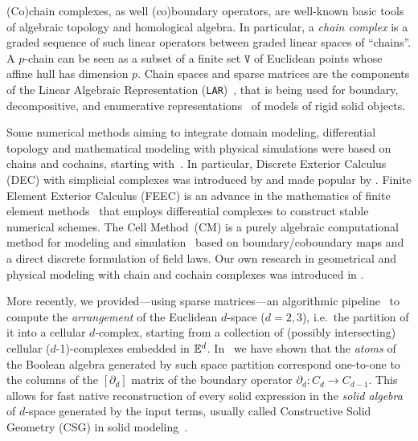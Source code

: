 (Co)chain complexes, as well (co)boundary operators, are well-known
basic tools of algebraic topology and homological algebra. In
particular, a \emph{chain complex} is a graded sequence of such linear
operators between graded linear spaces of ``chains''. A $p$-chain can be seen as a subset of a finite set $\texttt{V}$ of Euclidean points whose affine hull has dimension $p$.
Chain spaces and sparse matrices are the components of the Linear Algebraic
Representation (\texttt{LAR})~\cite{Dicarlo:2014:TNL:2543138.2543294}, that is being used for
boundary, decompositive, and enumerative
representations~\cite{Requicha:1980:RRS:356827.356833} of models of rigid solid objects.

Some numerical methods aiming to integrate domain modeling, differential
topology and mathematical modeling with physical simulations were based on chains and
cochains, starting with~\cite{PALMER1995733,Palmer1993}. In particular,
Discrete Exterior Calculus (DEC) with simplicial complexes was
introduced by \cite{Hirani:2003:DEC:959640} and made popular by
\cite{Desbrun:2006:DDF:1185657.1185665,Elcott:2006:BYO:1185657.1185666}.
Finite Element Exterior Calculus 
(FEEC) is an advance in the mathematics of finite element 
methods~\cite{arnold_falk_winther_2006,Arnold:2010,Arnold:2018} that employs differential
complexes to construct stable numerical schemes. The Cell
Method~(CM) is a purely algebraic computational method
for modeling and
simulation~\cite{Tonti:1975,Tonti:2013,Ferretti:2014}
based on boundary/coboundary maps and a direct discrete formulation of
field laws. Our own research in geometrical and physical modeling with
chain and cochain complexes was introduced in
\cite{DiCarlo:2009:DPU:1629255.1629273,ieee-tase,Dicarlo:2014:TNL:2543138.2543294}.

More recently, we provided---using sparse
matrices---an algorithmic pipeline~\cite{TSAS:19} to compute the \emph{arrangement} of the
Euclidean \(d\)-space (\(d=2,3\)), i.e.~the partition of
it into a cellular \(d\)-complex, starting from a collection of (possibly intersecting) cellular
(\(d\)-1)-complexes embedded in \(\mathbb{E}^d\). In~\cite{paoluzzi2019finite} we
have shown that the \emph{atoms} of the Boolean algebra generated by
such space partition correspond one-to-one to the columns of the $[\partial_d]$ matrix
of the boundary operator \(\partial_d : C_d \to C_{d-1}\). This allows for fast
native reconstruction of every solid expression in the \emph{solid algebra} of
\(d\)-space generated by the input terms, usually called Constructive Solid Geometry (CSG)
in solid modeling~\cite{Requicha:1980:RRS:356827.356833}.

